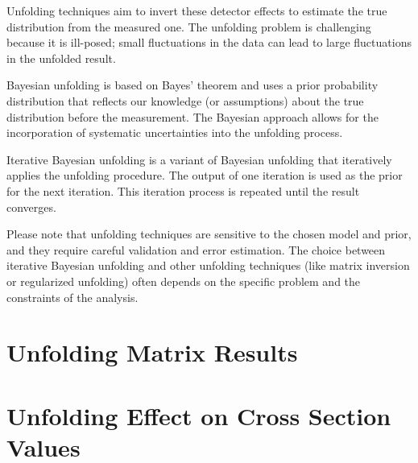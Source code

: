     Unfolding techniques aim to invert these detector effects to estimate the true distribution from the measured one. The unfolding problem is challenging because it is ill-posed; small fluctuations in the data can lead to large fluctuations in the unfolded result.
    
    Bayesian unfolding is based on Bayes' theorem and uses a prior probability distribution that reflects our knowledge (or assumptions) about the true distribution before the measurement. The Bayesian approach allows for the incorporation of systematic uncertainties into the unfolding process.
    
    Iterative Bayesian unfolding is a variant of Bayesian unfolding that iteratively applies the unfolding procedure. The output of one iteration is used as the prior for the next iteration. This iteration process is repeated until the result converges.
    
    Please note that unfolding techniques are sensitive to the chosen model and prior, and they require careful validation and error estimation. The choice between iterative Bayesian unfolding and other unfolding techniques (like matrix inversion or regularized unfolding) often depends on the specific problem and the constraints of the analysis.


\section{Unfolding Matrix Results}

\section{Unfolding Effect on Cross Section Values}
